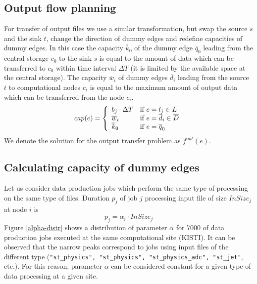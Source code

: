 \documentclass[english]{ddny}
\begin{document}
\subsection{Output flow planning}
For transfer of output files we use a similar transformation, but swap the
source $s$ and the sink $t$, change the direction of dummy edges and redefine
capacities of dummy edges. In this case the capacity $\overline{k}_{0}$ of the
dummy edge $\overline{q}_{0}$ leading from the central storage $c_0$ to the
sink $s$ is equal to the amount of data which can be transferred to $c_0$
within time interval $\Delta T$ (it is limited by the available space at the
central storage). The capacity $\overline{w}_{i}$ of dummy edges
$\overline{d}_{i}$ leading from the source $t$ to computational nodes $c_{i}$
is equal to the maximum amount of output data which can be transferred from
the node $c_{i}$.
%
\begin{equation}
\label{edge_cap_out}
cap(e) = \left\{ 
  \begin{array}{l l}
    b_{j} \cdot \Delta T & \text{if }e = l_{j} \in L \\
    \overline{w}_{i} & \text{if } e = \overline{d}_{i} \in \overline{D}\\
    \overline{k}_{0} & \text{if } e = \overline{q}_{0}
  \end{array} \right.
\end{equation}
%
We denote the solution for the output transfer problem as $f^{out}(e)$.

\subsection{Calculating capacity of dummy edges}
\label{dummycap}
Let us consider data production jobs which perform the same type of processing on the same type of files.
Duration $p_{j}$ of job $j$  processing input file of size $InSize_{j}$ at node $i$ is
\begin{equation}
\label{alpha}
p_{j} = \alpha_{i} \cdot InSize_{j} 
\end{equation}
Figure \ref{alpha-distr} shows a distribution of parameter $\alpha$ for 7000 of data production jobs executed at the same computational site (KISTI). It can be observed that the narrow peaks correspond to jobs using input files of the different type (\texttt{"st\_physics", "st\_physics", "st\_physics\_adc", "st\_jet"}, etc.). For this reason, parameter $\alpha$ can be considered constant for a given type of data processing at a given site. 
\end{document}
